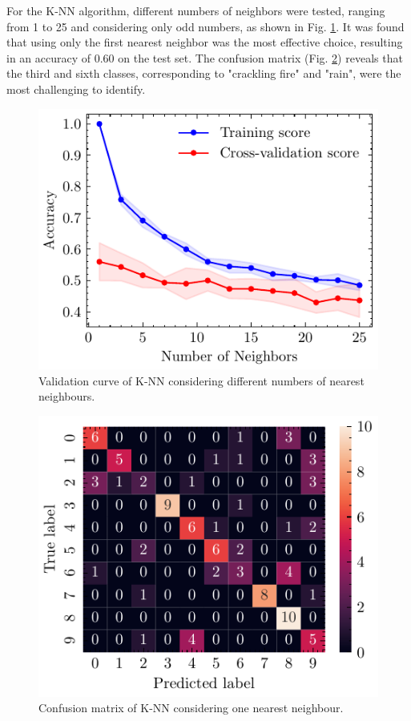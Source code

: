 \documentclass[journal]{IEEEtran}
\begin{document}
For the K-NN algorithm, different numbers of neighbors were tested, ranging from 1 to 25 and considering only odd numbers, as shown in Fig. \ref{fig:knn_valdiation_curve}. It was found that using only the first nearest neighbor was the most effective choice, resulting in an accuracy of 0.60 on the test set. The confusion matrix (Fig. \ref{fig:knn_confusion_matrix}) reveals that the third and sixth classes, corresponding to "crackling fire" and "rain", were the most challenging to identify.
\begin{figure}[ht]
    \centering
    \includegraphics[width=\linewidth]{knn_validation_curve.pdf}
    \caption{Validation curve of K-NN considering different numbers of nearest neighbours.}
    \label{fig:knn_valdiation_curve}
\end{figure}
\begin{figure}[ht]
    \centering
    \includegraphics[width=\linewidth]{confusion_matrix_knn.pdf}
    \caption{Confusion matrix of K-NN considering one nearest neighbour.}
    \label{fig:knn_confusion_matrix}
\end{figure}
\end{document}
